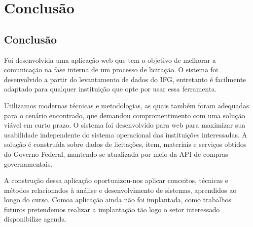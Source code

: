 \chapter[Conclusão]{Conclusão}\label{Capitulo6}

\section{Conclusão}

Foi desenvolvida uma aplicação web que tem o objetivo de melhorar a comunicação na fase interna de um processo de licitação.
O sistema foi desenvolvido a partir do levantamento de dados do IFG, entretanto é facilmente adaptado para qualquer instituição que opte por usar essa ferramenta. 

Utilizamos modernas técnicas e metodologias, as quais também foram adequadas para o cenário encontrado, que demandou compromentimento com uma solução viável em curto prazo.
O sistema foi desenvolvido para web para maximizar sua usabilidade independente do sistema operacional das instituições interessadas.
A solução é construída sobre dados de licitações, item, materiais e serviços obtidos do Governo Federal, mantendo-se atualizada por meio da API de compras governamentais.

A construção dessa aplicação oportunizou-nos aplicar conceitos, técnicas e métodos relacionados à análise e desenvolvimento de sistemas, aprendidos ao longo do curso.
Comoa aplicação ainda não foi implantada, como trabalhos futuros pretendemos realizar a implantação tão logo o setor interessado disponibilize agenda.

